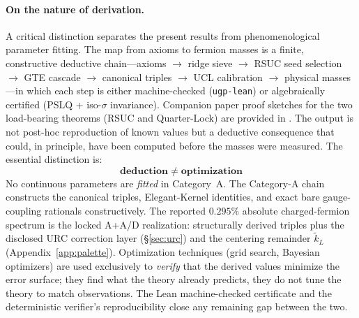 \documentclass[11pt]{article}
\theoremstyle{remark}
\begin{document}
\paragraph{On the nature of derivation.}
A critical distinction separates the present results from phenomenological parameter fitting.
The map from axioms to fermion masses is a finite, constructive deductive chain---axioms $\to$ ridge sieve $\to$ RSUC seed selection $\to$ GTE cascade $\to$ canonical triples $\to$ UCL calibration $\to$ physical masses---in which each step is either machine-checked (\texttt{ugp-lean}) or algebraically certified (PSLQ + iso-$\sigma$ invariance).
Companion paper proof sketches for the two load-bearing theorems (RSUC and Quarter-Lock) are provided in .
The output is not post-hoc reproduction of known values but a deductive consequence that could, in principle, have been computed before the masses were measured.
The essential distinction is:
\begin{equation}
  \textbf{deduction} \;\neq\; \textbf{optimization}
  \label{eq:deduction_not_fit}
\end{equation}
No continuous parameters are \emph{fitted} in Category~A.  The Category-A chain constructs the canonical triples, Elegant-Kernel identities, and exact bare gauge-coupling rationals constructively.  The reported $0.295\%$ absolute charged-fermion spectrum is the locked A+A/D realization: structurally derived triples plus the disclosed URC correction layer (\S\ref{sec:urc}) and the centering remainder $\tilde{k}_L$ (Appendix~\ref{app:palette}).
Optimization techniques (grid search, Bayesian optimizers) are used exclusively to \emph{verify} that the derived values minimize the error surface; they find what the theory already predicts, they do not tune the theory to match observations.
The Lean machine-checked certificate and the deterministic verifier's reproducibility close any remaining gap between the two.
\end{document}
